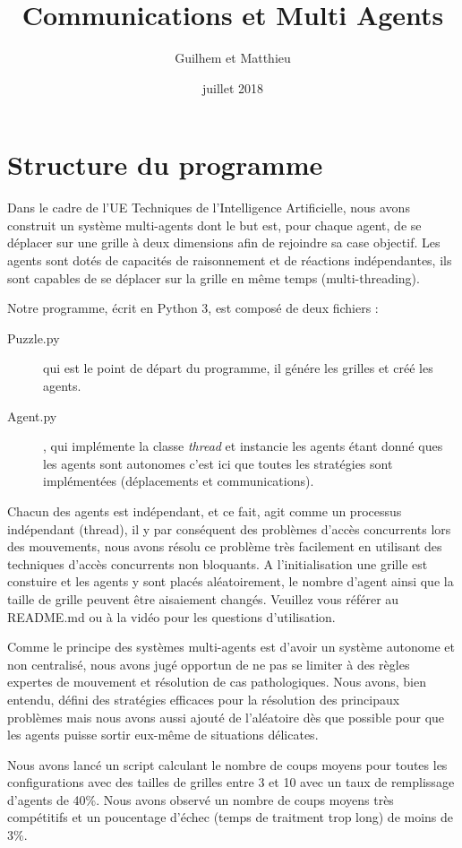 \documentclass[a4paper, 12pt,twocolumn, french]{article}
\title{Communications et Multi Agents}
\author{Guilhem \bsc{Marion} et Matthieu \bsc{Vieira}}
\date{juillet 2018}
\begin{document}
\maketitle

\section{Structure du programme}

Dans le cadre de l'UE Techniques de l'Intelligence Artificielle, nous avons construit un système multi-agents dont le but est, pour chaque agent, de se déplacer sur une grille à deux dimensions afin de rejoindre sa case objectif. Les agents sont dotés de capacités de raisonnement et de réactions indépendantes, ils sont capables de se déplacer sur la grille en même temps (multi-threading).

Notre programme, écrit en Python 3, est composé de deux fichiers :
\begin{description}
	\item[Puzzle.py] qui est le point de départ du programme, il génére les grilles et créé les agents.
	\item[Agent.py], qui implémente la classe \textit{thread} et instancie les agents étant donné ques les agents sont autonomes c'est ici que toutes les stratégies sont implémentées (déplacements et communications).
\end{description}

Chacun des agents est indépendant, et ce fait, agit comme un processus indépendant (thread), il y par conséquent des problèmes d'accès concurrents lors des mouvements, nous avons résolu ce problème très facilement en utilisant des techniques d'accès concurrents non bloquants. A l'initialisation une grille est constuire et les agents y sont placés aléatoirement, le nombre d'agent ainsi que la taille de grille peuvent être aisaiement changés. Veuillez vous référer au README.md ou à la vidéo pour les questions d'utilisation. 

Comme le principe des systèmes multi-agents est d'avoir un système autonome et non centralisé, nous avons jugé opportun de ne pas se limiter à des règles expertes de mouvement et résolution de cas pathologiques. Nous avons, bien entendu, défini des stratégies efficaces pour la résolution des principaux problèmes mais nous avons aussi ajouté de l'aléatoire dès que possible pour que les agents puisse sortir eux-même de situations délicates.

Nous avons lancé un script calculant le nombre de coups moyens pour toutes les configurations avec des tailles de grilles entre 3 et 10 avec un taux de remplissage d'agents de 40\%. Nous avons observé un nombre de coups moyens très compétitifs et un poucentage d'échec (temps de traitment trop long) de moins de 3\%.
\end{document}
